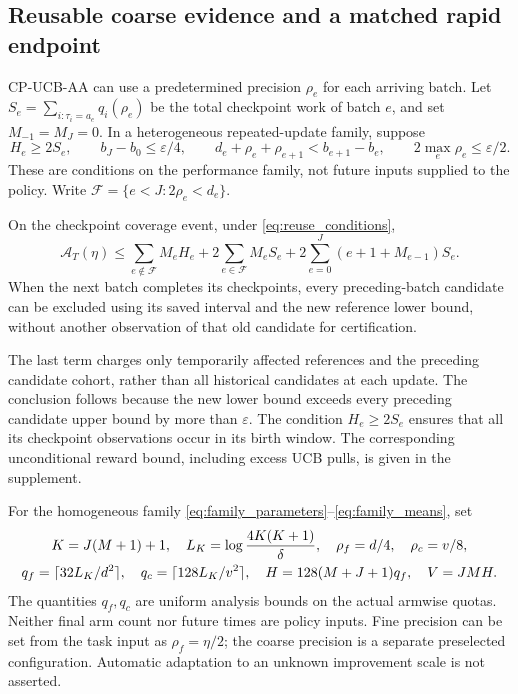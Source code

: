\subsection{Reusable coarse evidence and a matched rapid endpoint}

CP-UCB-AA can use a predetermined precision $\rho_e$ for each arriving batch.
Let $S_e=\sum_{i:\tau_i=a_e}q_i(\rho_e)$ be the total checkpoint work of
batch $e$, and set $M_{-1}=M_J=0$. In a heterogeneous repeated-update family,
suppose
\begin{equation}
 H_e\ge2S_e,\qquad b_J-b_0\le\varepsilon/4,\qquad
 d_e+\rho_e+\rho_{e+1}<b_{e+1}-b_e,\qquad
 2\max_e\rho_e\le\varepsilon/2.
 \label{eq:reuse_conditions}
\end{equation}
These are conditions on the performance family, not future inputs supplied to
the policy. Write $\mathcal F=\{e<J:2\rho_e<d_e\}$.

\begin{proposition}
\label{thm:reuse}
On the checkpoint coverage event, under \eqref{eq:reuse_conditions},
\begin{equation}
 \mathcal A_T(\eta)\le
 \sum_{e\notin\mathcal F}M_eH_e+
 2\sum_{e\in\mathcal F}M_eS_e+
 2\sum_{e=0}^J(e+1+M_{e-1})S_e.
 \label{eq:reuse_area}
\end{equation}
When the next batch completes its checkpoints, every preceding-batch candidate
can be excluded using its saved interval and the new reference lower bound,
without another observation of that old candidate for certification.
\end{proposition}

The last term charges only temporarily affected references and the preceding
candidate cohort, rather than all historical candidates at each update.
The conclusion follows because the new lower bound exceeds every preceding
candidate upper bound by more than $\varepsilon$. The condition
$H_e\ge2S_e$ ensures that all its checkpoint observations occur in its birth
window. The corresponding unconditional reward bound, including excess UCB
pulls, is given in the supplement.

For the homogeneous family \eqref{eq:family_parameters}--\eqref{eq:family_means},
set
\begin{gather}
 K=J(M+1)+1,\quad L_K=\log\frac{4K(K+1)}\delta,\quad
 \rho_f=d/4,\quad\rho_c=v/8,\notag\\
 q_f=\lceil32L_K/d^2\rceil,\quad q_c=\lceil128L_K/v^2\rceil,\quad
 H=128(M+J+1)q_f,\quad V=JMH.
 \label{eq:chosen_horizon}
\end{gather}
The quantities $q_f,q_c$ are uniform analysis bounds on the actual armwise
quotas. Neither final arm count nor future times are policy inputs. Fine
precision can be set from the task input as $\rho_f=\eta/2$; the coarse
precision is a separate preselected configuration. Automatic adaptation to
an unknown improvement scale is not asserted.

